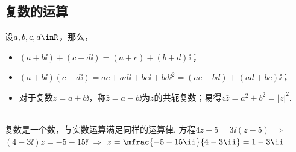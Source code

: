   \subsection{复数的运算}
    设$a,b,c,d\inR$，那么，
    \begin{itemize}
      \item $(a+b\ii)+(c+d\ii)=(a+c)+(b+d)\ii$；
      \item $(a+b\ii)(c+d\ii)=ac+ad\ii+bc\ii+bd\ii^2=(ac-bd)+(ad+bc)\ii$；
      \item 对于复数$z=a+b\ii$，称$\bar{z}=a-b\ii$为$z$的共轭复数；易得$z \bar{z}=a^2+b^2=|z|^2$.
    \end{itemize}
    \\
    {\kaishu 复数是一个数，与实数运算满足同样的运算律. 方程$4z+5=3\ii(z-5)$ $\Longrightarrow$ $(4-3\ii)z=-5-15\ii$ $\Longrightarrow$ $z=\mfrac{-5-15\ii}{4-3\ii}=1-3\ii$}
